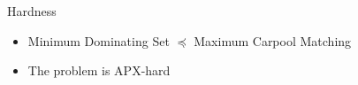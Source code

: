\begin{frame}[<+->]{Hardness}
\begin{itemize}
  \item Minimum Dominating Set $\preceq$ Maximum Carpool Matching
  \item The problem is APX-hard
\end{itemize}

\vfill

\centering


\end{frame}